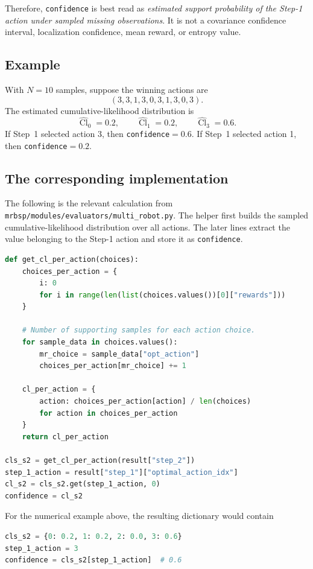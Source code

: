 \documentclass[11pt,a4paper]{article}
\newcommand{\Cl}{\operatorname{Cl}}
\begin{document}
Therefore, \texttt{confidence} is best read as
\emph{estimated support probability of the Step-1 action under sampled missing
observations}.  It is not a covariance confidence interval, localization
confidence, mean reward, or entropy value.

\subsection*{Example}

With $N=10$ samples, suppose the winning actions are
\[
    (3,3,1,3,0,3,1,3,0,3).
\]
The estimated cumulative-likelihood distribution is
\[
    \widehat{\Cl}_0=0.2,\qquad
    \widehat{\Cl}_1=0.2,\qquad
    \widehat{\Cl}_3=0.6.
\]
If Step~1 selected action 3, then \texttt{confidence}$=0.6$.  If Step~1
selected action 1, then \texttt{confidence}$=0.2$.

\subsection*{The corresponding implementation}

The following is the relevant calculation from
\texttt{mrbsp/modules/evaluators/multi\_robot.py}.  The helper first builds the
sampled cumulative-likelihood distribution over all actions.  The later lines
extract the value belonging to the Step-1 action and store it as
\texttt{confidence}.

\begin{lstlisting}[language=Python]
def get_cl_per_action(choices):
    choices_per_action = {
        i: 0
        for i in range(len(list(choices.values())[0]["rewards"]))
    }

    # Number of supporting samples for each action choice.
    for sample_data in choices.values():
        mr_choice = sample_data["opt_action"]
        choices_per_action[mr_choice] += 1

    cl_per_action = {
        action: choices_per_action[action] / len(choices)
        for action in choices_per_action
    }
    return cl_per_action

cls_s2 = get_cl_per_action(result["step_2"])
step_1_action = result["step_1"]["optimal_action_idx"]
cl_s2 = cls_s2.get(step_1_action, 0)
confidence = cl_s2
\end{lstlisting}

For the numerical example above, the resulting dictionary would contain
\begin{lstlisting}[language=Python]
cls_s2 = {0: 0.2, 1: 0.2, 2: 0.0, 3: 0.6}
step_1_action = 3
confidence = cls_s2[step_1_action]  # 0.6
\end{lstlisting}
\end{document}
